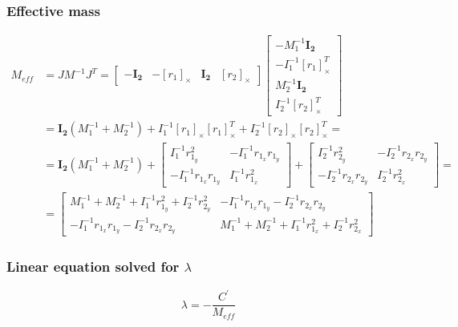 \documentclass{article}
\begin{document}
	\subsubsection{Effective mass}
	\begin{align}
		M_{eff}
		&=JM^{-1}J^T=
		\begin{bmatrix}
			-\boldsymbol{I_2} & -[r_1]_\times & \boldsymbol{I_2} & [r_2]_\times
		\end{bmatrix}
		\begin{bmatrix}
			-M_1^{-1}\boldsymbol{I_2}\\
			-I_1^{-1}[r_1]_\times^T\\
			M_2^{-1}\boldsymbol{I_2}\\
			I_2^{-1}[r_2]_\times^T
		\end{bmatrix}\\
		&=
		\boldsymbol{I_2}(M_1^{-1}+M_2^{-1})+I_1^{-1}[r_1]_\times[r_1]_\times^T+I_2^{-1}[r_2]_\times[r_2]_\times^T=\\
		&=
		\boldsymbol{I_2}(M_1^{-1}+M_2^{-1})
		+
		\begin{bmatrix}
			I_1^{-1}r_{1_y}^2		& -I_1^{-1}r_{1_x}r_{1_y}\\
			-I_1^{-1}r_{1_x}r_{1_y}	& I_1^{-1}r_{1_x}^2
		\end{bmatrix}
		+
		\begin{bmatrix}
			I_2^{-1}r_{2_y}^2		& -I_2^{-1}r_{2_x}r_{2_y}\\
			-I_2^{-1}r_{2_x}r_{2_y}	& I_2^{-1}r_{2_x}^2
		\end{bmatrix}=\\
		&=
		\begin{bmatrix}
			M_1^{-1}+M_2^{-1} + I_1^{-1}r_{1_y}^2 + I_2^{-1}r_{2_y}^2		& -I_1^{-1}r_{1_x}r_{1_y} - I_2^{-1}r_{2_x}r_{2_y}\\
			-I_1^{-1}r_{1_x}r_{1_y} - I_2^{-1}r_{2_x}r_{2_y}	& M_1^{-1}+M_2^{-1} + I_1^{-1}r_{1_x}^2 +  I_2^{-1}r_{2_x}^2
		\end{bmatrix}
	\end{align}
	\subsubsection{Linear equation solved for $\lambda$}
	$$
	\lambda=-\frac{C^{'}}{M_{eff}}
	$$
\end{document}
